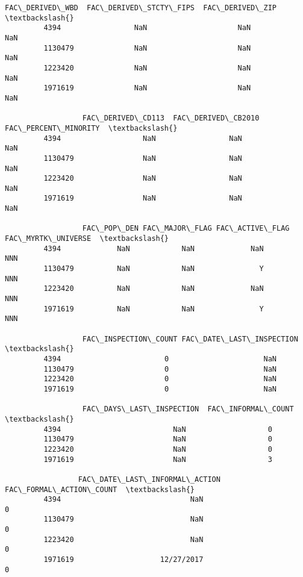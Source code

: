 \documentclass[11pt]{article}
\begin{document}
\begin{Verbatim}[commandchars=\\\{\}]
                  FAC\_DERIVED\_WBD  FAC\_DERIVED\_STCTY\_FIPS  FAC\_DERIVED\_ZIP  \textbackslash{}
         4394                 NaN                     NaN              NaN   
         1130479              NaN                     NaN              NaN   
         1223420              NaN                     NaN              NaN   
         1971619              NaN                     NaN              NaN   
         
                  FAC\_DERIVED\_CD113  FAC\_DERIVED\_CB2010  FAC\_PERCENT\_MINORITY  \textbackslash{}
         4394                   NaN                 NaN                   NaN   
         1130479                NaN                 NaN                   NaN   
         1223420                NaN                 NaN                   NaN   
         1971619                NaN                 NaN                   NaN   
         
                  FAC\_POP\_DEN FAC\_MAJOR\_FLAG FAC\_ACTIVE\_FLAG FAC\_MYRTK\_UNIVERSE  \textbackslash{}
         4394             NaN            NaN             NaN                NNN   
         1130479          NaN            NaN               Y                NNN   
         1223420          NaN            NaN             NaN                NNN   
         1971619          NaN            NaN               Y                NNN   
         
                  FAC\_INSPECTION\_COUNT FAC\_DATE\_LAST\_INSPECTION  \textbackslash{}
         4394                        0                      NaN   
         1130479                     0                      NaN   
         1223420                     0                      NaN   
         1971619                     0                      NaN   
         
                  FAC\_DAYS\_LAST\_INSPECTION  FAC\_INFORMAL\_COUNT  \textbackslash{}
         4394                          NaN                   0   
         1130479                       NaN                   0   
         1223420                       NaN                   0   
         1971619                       NaN                   3   
         
                 FAC\_DATE\_LAST\_INFORMAL\_ACTION  FAC\_FORMAL\_ACTION\_COUNT  \textbackslash{}
         4394                              NaN                        0   
         1130479                           NaN                        0   
         1223420                           NaN                        0   
         1971619                    12/27/2017                        0   
         

\end{Verbatim}
\end{document}
